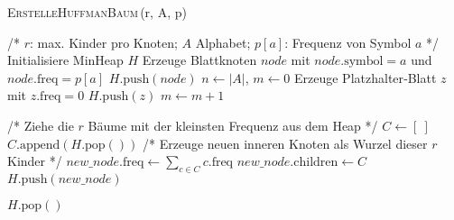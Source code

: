 \documentclass[a4paper,10pt,ngerman]{scrartcl}
\begin{document}
    \begin{algorithm} [H]
        \caption{\textsc{ErstelleHuffmanBaum}\,(r, A, p)}
        \label{alg:huffman-r-ary}
        \begin{algorithmic}[1]
                \State /* $r$: max. Kinder pro Knoten; $A$ Alphabet; $p[a]$: Frequenz von Symbol $a$ */
                \State Initialisiere MinHeap $H$
                    \State Erzeuge Blattknoten $node$ mit $node.\text{symbol}\!=\!a$ und $node.\text{freq}\!=\!p[a]$
                    \State $H.\text{push}(node)$
                \EndFor
                \State $n \gets |A|$, \quad $m \gets 0$
                    \State Erzeuge Platzhalter‐Blatt $z$ mit $z.\text{freq}=0$
                    \State $H.\text{push}(z)$
                    \State $m \gets m + 1$
                \EndWhile

                    \State /* Ziehe die $r$ Bäume mit der kleinsten Frequenz aus dem Heap */
                    \State $C \gets [\ ]$ 
                        \State $C.\text{append}(H.\text{pop}())$
                    \EndFor
                    \State /* Erzeuge neuen inneren Knoten als Wurzel dieser $r$ Kinder */
                    \State $new\_node.\text{freq} \gets \sum_{c \in C} c.\text{freq}$
                    \State $new\_node.\text{children} \gets C$
                    \State $H.\text{push}(new\_node)$
                \EndWhile

                \State \Return $H.\text{pop}()$  
            \EndFunction
        \end{algorithmic}
    \end{algorithm}
\end{document}
